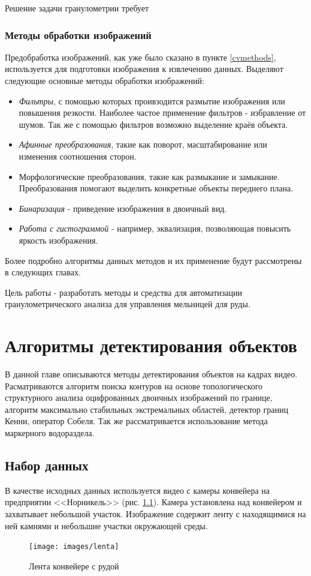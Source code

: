 \documentclass[times]{itmo-student-thesis}
\begin{document}
Решение задачи гранулометрии требует 
\subsection{Методы обработки изображений}
Предобработка изображений, как уже было сказано в пункте \ref{cvmethods}, используется для подготовки изображения к извлечению данных.
Выделяют следующие основные методы обработки изображений:

\begin{itemize}
	\item \textit{Фильтры}, с помощью которых проивзодится размытие изображения или повышения резкости. Наиболее частое применение фильтров - избравление от шумов.  Так же с помощью фильтров возможно выделение краёв объекта. 
	\item \textit{Афинные преобразования}, такие как поворот, масштабирование или изменения соотношения сторон.
	\item Морфологические преобразования, такие как размыкание и замыкание. Преобразования помогают выделить конкретные объекты переднего плана.
	\item \textit{Бинаризация} - приведение изображения в двоичный вид.
	\item \textit{Работа с гистограммой} - например, эквализация, позволяющая повысить яркость изображения.
\end{itemize}
Более подробно алгоритмы данных методов и их применение будут рассмотрены в следующих главах.
\finishrelatedwork

\chapterconclusion
Цель работы - разработать методы и средства для автоматизации гранулометрического анализа для управления мельницей для руды.

\chapter{Алгоритмы детектирования объектов}\label{detecting}
В данной главе описываются методы детектирования объектов на кадрах видео. Расматриваются
алгоритм поиска контуров на основе топологического структурного анализа оцифрованных двоичных изображений по границе, алгоритм максимально стабильных экстремальных областей, детектор границ Кенни, оператор Собеля. Так же рассматривается использование метода маркерного водораздела. 

\section{Набор данных}
В качестве исходных данных используется видео с камеры конвейера на предприятии <<Норникель>> (рис. \ref{fig:lenta}). Камера установлена над конвейером и захватывает небольшой участок. 
Изображение содержит ленту с находящимися на ней камнями и небольшие участки окружающей среды.
\begin{figure}[h!]
	\centering
	\texttt{[image: images/lenta]}
	\caption{Лента конвейере с рудой}
	\label{fig:lenta}
\end{figure}
\end{document}
